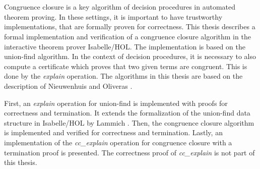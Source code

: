 \chapter{\abstractname}

Congruence closure is a key algorithm of decision procedures in automated theorem proving. In these settings, it is important to have trustworthy implementations, that are formally proven for correctness.
This thesis describes a formal implementation and verification of a congruence closure algorithm in the interactive theorem prover Isabelle/HOL.
The implementation is based on the union-find algorithm.
In the context of decision procedures, it is necessary to also compute a certificate which proves that two given terms are congruent.
This is done by the \emph{explain} operation.
The algorithms in this thesis are based on the description of Nieuwenhuis and Oliveras \cite{Nieuwenhuis}.

First, an \emph{explain} operation for union-find is implemented with proofs for correctness and termination. It extends the formalization of the union-find data structure in Isabelle/HOL by Lammich \cite{unionfind-isabelle}.
Then, the congruence closure algorithm is implemented and verified for correctness and termination.
Lastly, an implementation of the \emph{cc\_explain} operation for congruence closure with a termination proof is presented.
The correctness proof of \emph{cc\_explain} is not part of this thesis.

